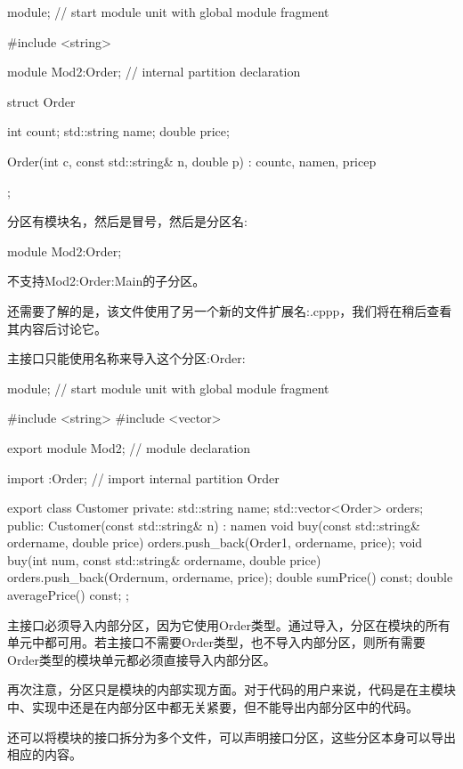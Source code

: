 \begin{cpp}
module; // start module unit with global module fragment

#include <string>

module Mod2:Order; // internal partition declaration

struct Order {
	int count;
	std::string name;
	double price;
	
	Order(int c, const std::string& n, double p)
		: count{c}, name{n}, price{p} {
	}
};
\end{cpp}

分区有模块名，然后是冒号，然后是分区名:

\begin{cpp}
module Mod2:Order;
\end{cpp}

不支持Mod2:Order:Main的子分区。

还需要了解的是，该文件使用了另一个新的文件扩展名:.cppp，我们将在稍后查看其内容后讨论它。

主接口只能使用名称来导入这个分区:Order:


\begin{cpp}
module; // start module unit with global module fragment

#include <string>
#include <vector>

export module Mod2; // module declaration

import :Order; // import internal partition Order

export class Customer {
private:
	std::string name;
	std::vector<Order> orders;
public:
	Customer(const std::string& n)
	: name{n} {
	}
	void buy(const std::string& ordername, double price) {
		orders.push_back(Order{1, ordername, price});
	}
	void buy(int num, const std::string& ordername, double price) {
		orders.push_back(Order{num, ordername, price});
	}
	double sumPrice() const;
	double averagePrice() const;
};
\end{cpp}

主接口必须导入内部分区，因为它使用Order类型。通过导入，分区在模块的所有单元中都可用。若主接口不需要Order类型，也不导入内部分区，则所有需要Order类型的模块单元都必须直接导入内部分区。

再次注意，分区只是模块的内部实现方面。对于代码的用户来说，代码是在主模块中、实现中还是在内部分区中都无关紧要，但不能导出内部分区中的代码。


还可以将模块的接口拆分为多个文件，可以声明接口分区，这些分区本身可以导出相应的内容。

